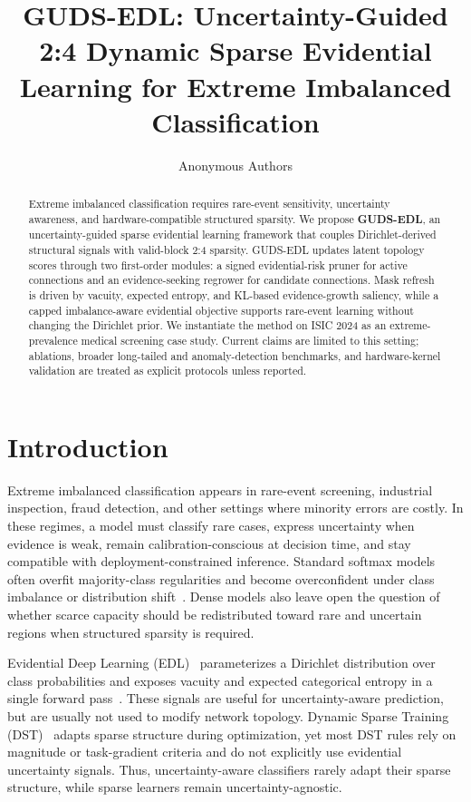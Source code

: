 \documentclass[letterpaper]{article} %
\title{GUDS-EDL: Uncertainty-Guided 2:4 Dynamic Sparse Evidential Learning for Extreme Imbalanced Classification}
\author{Anonymous Authors}
\begin{document}
\maketitle

\begin{abstract}
Extreme imbalanced classification requires rare-event sensitivity, uncertainty awareness, and hardware-compatible structured sparsity. We propose \textbf{GUDS-EDL}, an uncertainty-guided sparse evidential learning framework that couples Dirichlet-derived structural signals with valid-block 2:4 sparsity. GUDS-EDL updates latent topology scores through two first-order modules: a signed evidential-risk pruner for active connections and an evidence-seeking regrower for candidate connections. Mask refresh is driven by vacuity, expected entropy, and KL-based evidence-growth saliency, while a capped imbalance-aware evidential objective supports rare-event learning without changing the Dirichlet prior. We instantiate the method on ISIC 2024 as an extreme-prevalence medical screening case study. Current claims are limited to this setting; ablations, broader long-tailed and anomaly-detection benchmarks, and hardware-kernel validation are treated as explicit protocols unless reported.
\end{abstract}

\section{Introduction}\label{sec:intro}

Extreme imbalanced classification appears in rare-event screening, industrial inspection, fraud detection, and other settings where minority errors are costly. In these regimes, a model must classify rare cases, express uncertainty when evidence is weak, remain calibration-conscious at decision time, and stay compatible with deployment-constrained inference. Standard softmax models often overfit majority-class regularities and become overconfident under class imbalance or distribution shift~\cite{guo2017calibration}. Dense models also leave open the question of whether scarce capacity should be redistributed toward rare and uncertain regions when structured sparsity is required.

Evidential Deep Learning (EDL)~\cite{sensoy2018evidential} parameterizes a Dirichlet distribution over class probabilities and exposes vacuity and expected categorical entropy in a single forward pass~\cite{malinin2018predictive}. These signals are useful for uncertainty-aware prediction, but are usually not used to modify network topology. Dynamic Sparse Training (DST)~\cite{evci2020rigging} adapts sparse structure during optimization, yet most DST rules rely on magnitude or task-gradient criteria and do not explicitly use evidential uncertainty signals. Thus, uncertainty-aware classifiers rarely adapt their sparse structure, while sparse learners remain uncertainty-agnostic.
\end{document}
